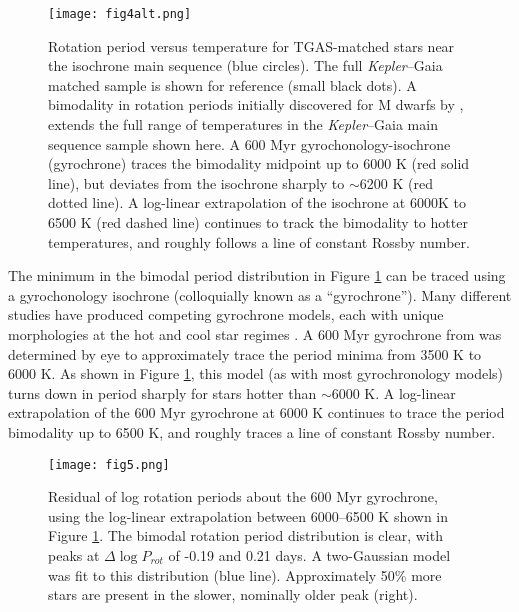 \documentclass[manuscript, letterpaper]{aastex6}
\newcommand{\Kepler}{\textsl{Kepler}\xspace}
\begin{document}
\begin{figure}[]
\centering
\texttt{[image: fig4alt.png]}
\caption{ Rotation period versus temperature for TGAS-matched stars near the isochrone main sequence (blue circles). 
The full \Kepler--Gaia matched sample is shown for reference (small black dots). A bimodality in rotation periods initially discovered for M dwarfs by \citet{mcquillan2013}, extends the full range of temperatures in the \Kepler--Gaia main sequence sample shown here.
A \citet{meibom2011} 600 Myr gyrochonology-isochrone (gyrochrone) traces the bimodality midpoint up to 6000 K (red solid line), but deviates from the isochrone sharply to $\sim$6200 K (red dotted line). A log-linear extrapolation of the isochrone at 6000K to 6500 K (red dashed line) continues to track the bimodality to hotter temperatures, and roughly follows a line of constant Rossby number. 
}
\label{fig:gyro}
\end{figure}



The minimum in the bimodal period distribution in Figure \ref{fig:gyro} can be traced using a gyrochonology isochrone (colloquially known as a ``gyrochrone'').  Many different studies have produced competing gyrochrone models, each with unique morphologies at the hot and cool star regimes \citep[e.g.][]{barnes2007,mamajek2008,meibom2011,angus2015}. A 600 Myr gyrochrone from \citet{meibom2011} was determined by eye to approximately trace the period minima from 3500 K to 6000 K. As shown in Figure \ref{fig:gyro}, this model (as with most gyrochronology models) turns down in period sharply for stars hotter than $\sim$6000 K. A log-linear extrapolation of the 600 Myr gyrochrone at 6000 K continues to trace the period bimodality up to 6500 K, and roughly traces a line of constant Rossby number.



\begin{figure}[]
\centering
\texttt{[image: fig5.png]}
\caption{Residual of log rotation periods about the \citet{meibom2011} 600 Myr gyrochrone, using the log-linear extrapolation between 6000--6500 K shown in Figure \ref{fig:gyro}. The bimodal rotation period distribution is clear, with peaks at $\Delta \log P_{rot}$ of -0.19 and 0.21 days. A two-Gaussian model was fit to this distribution (blue line).
Approximately 50\% more stars are present in the slower, nominally older peak (right).}
\label{fig:diff}
\end{figure}
\end{document}
